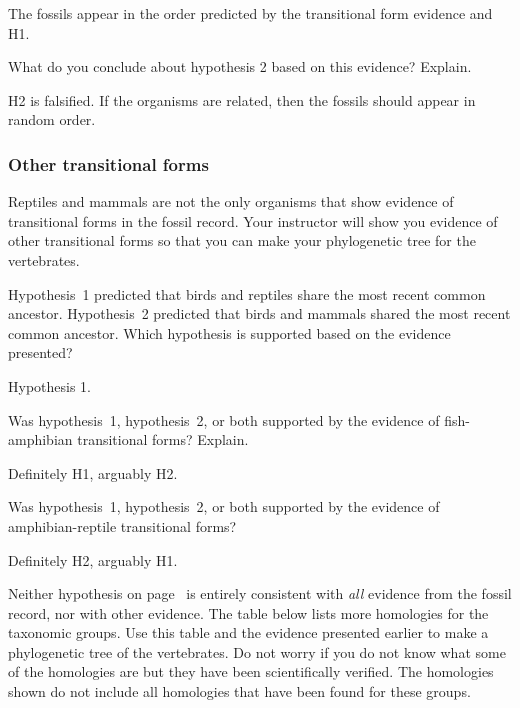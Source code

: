 \documentclass[12pt, hidelinks]{exam}
\newcommand*\AnswerBox[2]{%
    \parbox[t][#1]{0.92\textwidth}{%
    \begin{solution}#2\end{solution}}
    \vspace{\stretch{1}}
}
\begin{document}
\begin{questions}
\AnswerBox{2\baselineskip}{%
The fossils appear in the order predicted by the transitional form evidence and H1.
}

\question
What do you conclude about hypothesis 2 based on this
evidence? Explain.

\AnswerBox{2\baselineskip}{%
H2 is falsified. If the organisms are related, then the fossils should appear in random order.
}


\subsubsection*{Other transitional forms}

Reptiles and mammals are not the only organisms that show evidence of transitional forms in the fossil record. Your instructor will show you evidence of other transitional forms so that you can make your phylogenetic tree for the vertebrates. 

\question
Hypothesis~1 predicted that birds and reptiles share the most recent common ancestor. Hypothesis~2 predicted that birds and mammals shared the most recent common ancestor. Which hypothesis is supported based on the evidence presented?

\AnswerBox{2\baselineskip}{Hypothesis 1.}


\question
Was hypothesis~1, hypothesis~2, or both supported by the evidence of fish-amphibian transitional forms? Explain.

\AnswerBox{2\baselineskip}{Definitely H1, arguably H2.}

\question
Was hypothesis~1, hypothesis~2, or both supported by the evidence of amphibian-reptile transitional forms?

\AnswerBox{2\baselineskip}{Definitely H2, arguably H1.}

Neither hypothesis on page~\pageref{hypothesis1} is entirely consistent with \emph{all} evidence from the fossil record, nor with other evidence. The table below lists more homologies for the taxonomic groups. Use this table and the evidence presented earlier to make a phylogenetic tree of the vertebrates. Do not worry if you do not know what some of the homologies are but they have been scientifically verified. The homologies shown do not include all homologies that have been found for these groups.


\end{questions}
\end{document}
